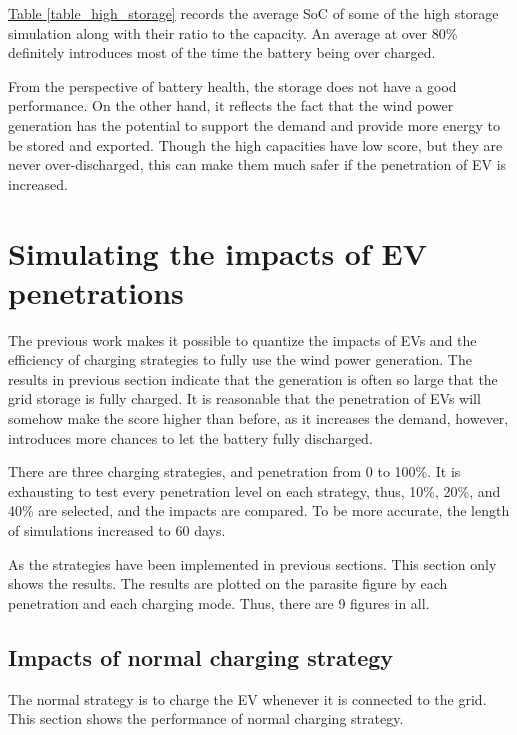 \documentclass[12pt,a4paper]{report}
\begin{document}
            \hyperref[table_high_storage]{Table \ref*{table_high_storage}} records the average SoC of some of the high storage simulation along with their ratio to the capacity. An average at over 80\% definitely introduces most of the time the battery being over charged.

            From the perspective of battery health, the storage does not have a good performance. On the other hand, it reflects the fact that the wind power generation has the potential to support the demand and provide more energy to be stored and exported. Though the high capacities have low score, but they are never over-discharged, this can make them much safer if the penetration of EV is increased.

            \section{Simulating the impacts of EV penetrations}
            The previous work makes it possible to quantize the impacts of EVs and the efficiency of charging strategies to fully use the wind power generation. The results in previous section indicate that the generation is often so large that the grid storage is fully charged. It is reasonable that the penetration of EVs will somehow make the score higher than before, as it increases the demand, however, introduces more chances to let the battery fully discharged.

            There are three charging strategies, and penetration from 0 to 100\%. It is exhausting to test every penetration level on each strategy, thus, 10\%, 20\%, and 40\% are selected, and the impacts are compared. To be more accurate, the length of simulations increased to 60 days.

             
            As the strategies have been implemented in previous sections. This section only shows the results. The results are plotted on the parasite figure by each penetration and each charging mode. Thus, there are 9 figures in all.

            \subsection{Impacts of normal charging strategy}
            The normal strategy is to charge the EV whenever it is connected to the grid. This section shows the performance of normal charging strategy.
\end{document}
